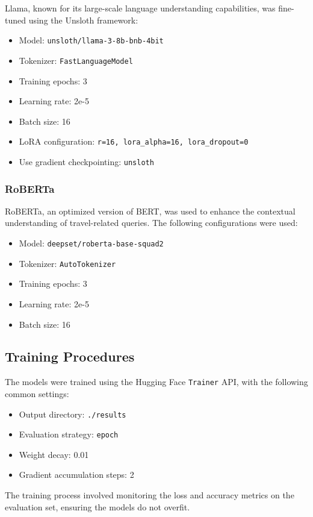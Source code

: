 \documentclass[conference]{IEEEtran}
\begin{document}
Llama, known for its large-scale language understanding capabilities, was fine-tuned using the Unsloth framework:
\begin{itemize}
    \item Model: \texttt{unsloth/llama-3-8b-bnb-4bit}
    \item Tokenizer: \texttt{FastLanguageModel}
    \item Training epochs: 3
    \item Learning rate: 2e-5
    \item Batch size: 16
    \item LoRA configuration: \texttt{r=16, lora\_alpha=16, lora\_dropout=0}
    \item Use gradient checkpointing: \texttt{unsloth}
\end{itemize}

\subsubsection{RoBERTa}

RoBERTa, an optimized version of BERT, was used to enhance the contextual understanding of travel-related queries. The following configurations were used:
\begin{itemize}
    \item Model: \texttt{deepset/roberta-base-squad2}
    \item Tokenizer: \texttt{AutoTokenizer}
    \item Training epochs: 3
    \item Learning rate: 2e-5
    \item Batch size: 16
\end{itemize}

\subsection{Training Procedures}

The models were trained using the Hugging Face \texttt{Trainer} API, with the following common settings:
\begin{itemize}
    \item Output directory: \texttt{./results}
    \item Evaluation strategy: \texttt{epoch}
    \item Weight decay: 0.01
    \item Gradient accumulation steps: 2
\end{itemize}

The training process involved monitoring the loss and accuracy metrics on the evaluation set, ensuring the models do not overfit.
\end{document}
